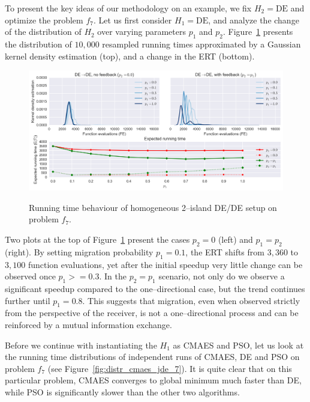 \documentclass{sig-alternate}
\begin{document}
To present the key ideas of our methodology on an example, we fix $H_2=\mbox{DE}$ and optimize the problem $f_7$.
Let us first consider $H_1 = \mbox{DE}$, and analyze the change of the distribution of $H_2$ over varying parameters $p_1$ and $p_2$.
Figure~\ref{fig:single_jde_jde_7} presents the distribution of $10,000$ resampled running times approximated by a Gaussian kernel density estimation (top), and a change in the ERT (bottom).
\begin{figure}[ht]
  \centering
  \includegraphics[width=\columnwidth]{figures/single_jde_jde_cec_7.png}
  \label{fig:single_jde_jde_7}
 \caption{Running time behaviour of homogeneous 2--island DE/DE setup on problem $f_{7}$.}
\end{figure}

Two plots at the top of Figure~\ref{fig:single_jde_jde_7} present the cases $p_2 = 0$ (left) and $p_1 = p_2$ (right).
By setting migration probability $p_1 = 0.1$, the ERT shifts from $3,360$ to $3,100$ function evaluations, yet after the initial speedup very little change can be observed once $p_1 >= 0.3$.
In the $p_2=p_1$ scenario, not only do we observe a significant speedup compared to the one--directional case, but the trend continues further until $p_1 = 0.8$.
This suggests that migration, even when observed strictly from the perspective of the receiver, is not a one--directional process and can be reinforced by a mutual information exchange.

Before we continue with instantiating the $H_1$ as CMAES and PSO, let us look at the running time distributions of independent runs of CMAES, DE and PSO on problem $f_7$ (see Figure~\ref{fig:distr_cmaes_jde_7}).
It is quite clear that on this particular problem, CMAES converges to global minimum much faster than DE, while PSO is significantly slower than the other two algorithms.
\end{document}
